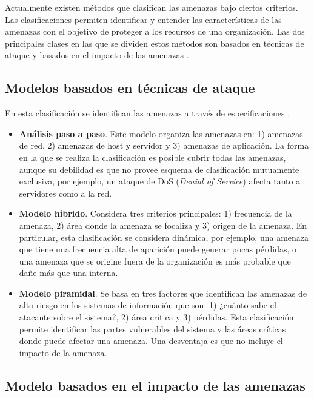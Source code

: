 Actualmente existen métodos que clasifican las amenazas bajo ciertos criterios. Las clasificaciones permiten identificar y entender las características de las amenazas con el objetivo de proteger a los recursos de una organización. Las dos principales clases en las que se dividen estos métodos son basados en técnicas de ataque y basados en el impacto de las amenazas \cite{JouRabAis14,gupta2016handbook}.

\subsection{Modelos basados en técnicas de ataque}

En esta clasificación se identifican las amenazas a través de especificaciones \cite{gupta2016handbook}. 

\begin{itemize}[noitemsep]
	\item \textbf{Análisis paso a paso}. Este modelo organiza las amenazas en: 1) amenazas de red, 2) amenazas de host y servidor y 3) amenazas de aplicación. La forma en la que se realiza la clasificación es posible cubrir todas las amenazas, aunque su debilidad es que no provee esquema de clasificación mutuamente exclusiva, por ejemplo, un ataque de DoS (\textit{Denial of Service}) afecta tanto a servidores como a la red.
	\item \textbf{Modelo híbrido}. Considera tres criterios principales: 1) frecuencia de la amenaza, 2) área donde la amenaza se focaliza y 3) origen de la amenaza. En particular, esta clasificación se considera dinámica, por ejemplo, una amenaza que tiene una frecuencia alta de aparición puede generar pocas pérdidas, o una amenaza que se origine fuera de la organización es más probable que dañe más que una interna.
	\item \textbf{Modelo piramidal}. Se basa en tres factores que identifican las amenazas de alto riesgo en los sistemas de información que son: 1) ¿cuánto sabe el atacante sobre el sistema?, 2) área crítica y 3) pérdidas. Esta clasificación permite identificar las partes vulnerables del sistema y las áreas críticas donde puede afectar una amenaza. Una desventaja es que no incluye el impacto de la amenaza. 
\end{itemize}


\subsection{Modelo basados en el impacto de las amenazas}

